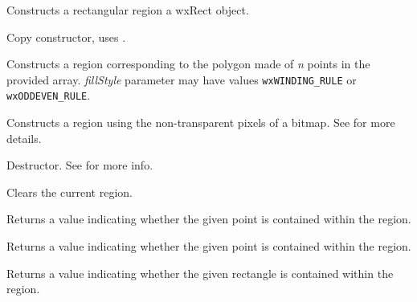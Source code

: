
Constructs a rectangular region a wxRect object.


Copy constructor, uses .


Constructs a region corresponding to the polygon made of {\it n} points in the
provided array. {\it fillStyle} parameter may have values
{\tt wxWINDING\_RULE} or {\tt wxODDEVEN\_RULE}.



Constructs a region using the non-transparent pixels of a bitmap.  See
 for more details.



\label{wxregiondtor}


Destructor.
See  for more info.


\label{wxregionclear}


Clears the current region.


\label{wxregioncontains}


Returns a value indicating whether the given point is contained within the region.


Returns a value indicating whether the given point is contained within the region.


Returns a value indicating whether the given rectangle is contained within the region.

